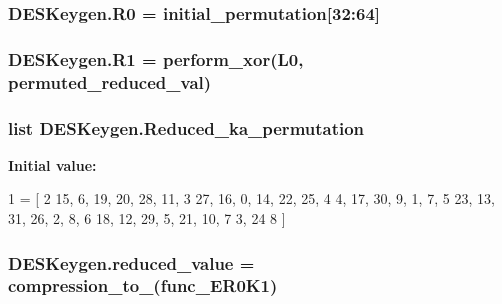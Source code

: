 \subsubsection[{\texorpdfstring{R0}{R0}}]{\setlength{\rightskip}{0pt plus 5cm}D\+E\+S\+Keygen.\+R0 = {\bf initial\+\_\+permutation}\mbox{[}32\+:64\mbox{]}}\hypertarget{namespaceDESKeygen_a69b702b5d982f05779ac0c29e54bb451}{}\label{namespaceDESKeygen_a69b702b5d982f05779ac0c29e54bb451}
\subsubsection[{\texorpdfstring{R1}{R1}}]{\setlength{\rightskip}{0pt plus 5cm}D\+E\+S\+Keygen.\+R1 = {\bf perform\+\_\+xor}({\bf L0}, {\bf permuted\+\_\+reduced\+\_\+val})}\hypertarget{namespaceDESKeygen_aee7e8f986620f3eda7fca3cbdfc5b4d3}{}\label{namespaceDESKeygen_aee7e8f986620f3eda7fca3cbdfc5b4d3}
\subsubsection[{\texorpdfstring{Reduced\+\_\+ka\+\_\+permutation}{Reduced_ka_permutation}}]{\setlength{\rightskip}{0pt plus 5cm}list D\+E\+S\+Keygen.\+Reduced\+\_\+ka\+\_\+permutation}\hypertarget{namespaceDESKeygen_a003266ecce54358bd8a478e22cd5f9a5}{}\label{namespaceDESKeygen_a003266ecce54358bd8a478e22cd5f9a5}
{\bfseries Initial value\+:}
\begin{DoxyCode}
1 = [
2     15, 6, 19, 20, 28, 11,
3     27, 16, 0, 14, 22, 25,
4     4, 17, 30, 9, 1, 7,
5     23, 13, 31, 26, 2, 8,
6     18, 12, 29, 5, 21, 10,
7     3, 24
8 ]
\end{DoxyCode}
\subsubsection[{\texorpdfstring{reduced\+\_\+value}{reduced_value}}]{\setlength{\rightskip}{0pt plus 5cm}D\+E\+S\+Keygen.\+reduced\+\_\+value = {\bf compression\+\_\+to\+\_}({\bf func\+\_\+\+E\+R0\+K1})}\hypertarget{namespaceDESKeygen_a4bbbb736b16854d40efe76c80b618630}{}\label{namespaceDESKeygen_a4bbbb736b16854d40efe76c80b618630}
